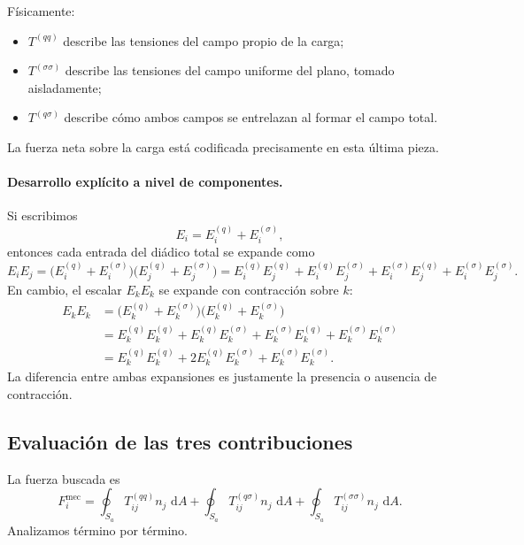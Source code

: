 \documentclass{article}
\numberwithin{equation}{section}
\newcommand{\dd}{\,\mathrm{d}}
\begin{document}
Físicamente:
\begin{itemize}[leftmargin=1.5em]
    \item $T^{(qq)}$ describe las tensiones del campo propio de la carga;
    \item $T^{(\sigma\sigma)}$ describe las tensiones del campo uniforme del plano, tomado aisladamente;
    \item $T^{(q\sigma)}$ describe cómo ambos campos se entrelazan al formar el campo total.
\end{itemize}
La fuerza neta sobre la carga está codificada precisamente en esta última pieza.



\paragraph{Desarrollo explícito a nivel de componentes.}
Si escribimos
\begin{equation*}
E_i=E_i^{(q)}+E_i^{(\sigma)},
\end{equation*}
entonces cada entrada del diádico total se expande como
\begin{equation*}
E_iE_j=\big(E_i^{(q)}+E_i^{(\sigma)}\big)\big(E_j^{(q)}+E_j^{(\sigma)}\big)
=E_i^{(q)}E_j^{(q)}+E_i^{(q)}E_j^{(\sigma)}+E_i^{(\sigma)}E_j^{(q)}+E_i^{(\sigma)}E_j^{(\sigma)}.
\end{equation*}
En cambio, el escalar $E_kE_k$ se expande con contracción sobre $k$:
\begin{align*}
E_kE_k
&=\big(E_k^{(q)}+E_k^{(\sigma)}\big)\big(E_k^{(q)}+E_k^{(\sigma)}\big)\\
&=E_k^{(q)}E_k^{(q)}+E_k^{(q)}E_k^{(\sigma)}+E_k^{(\sigma)}E_k^{(q)}+E_k^{(\sigma)}E_k^{(\sigma)}\\
&=E_k^{(q)}E_k^{(q)}+2E_k^{(q)}E_k^{(\sigma)}+E_k^{(\sigma)}E_k^{(\sigma)}.
\end{align*}
La diferencia entre ambas expansiones es justamente la presencia o ausencia de contracción.


\subsection{Evaluación de las tres contribuciones}

La fuerza buscada es
\begin{equation}
    F_i^{\mathrm{mec}}=
    \oint_{S_a} T_{ij}^{(qq)}n_j\,\dd A+
    \oint_{S_a} T_{ij}^{(q\sigma)}n_j\,\dd A+
    \oint_{S_a} T_{ij}^{(\sigma\sigma)}n_j\,\dd A.
\end{equation}
Analizamos término por término.
\end{document}
